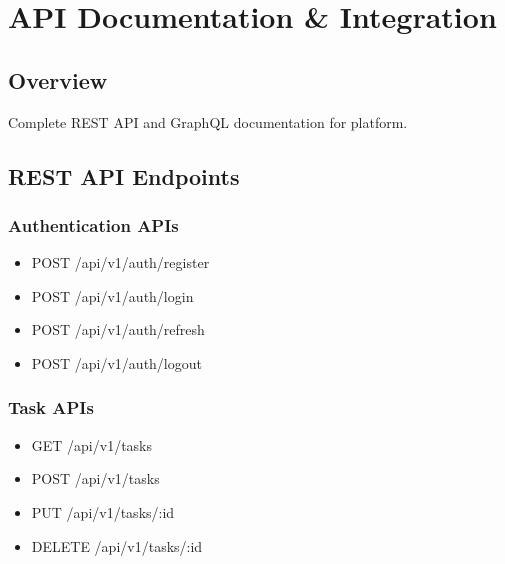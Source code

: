 \chapter{API Documentation \& Integration}
\label{ch:api-documentation}

\section{Overview}

Complete REST API and GraphQL documentation for \lifeos{} platform.

\section{REST API Endpoints}

\subsection{Authentication APIs}
\begin{itemize}
    \item POST /api/v1/auth/register
    \item POST /api/v1/auth/login
    \item POST /api/v1/auth/refresh
    \item POST /api/v1/auth/logout
\end{itemize}

\subsection{Task APIs}
\begin{itemize}
    \item GET /api/v1/tasks
    \item POST /api/v1/tasks
    \item PUT /api/v1/tasks/:id
    \item DELETE /api/v1/tasks/:id
\end{itemize}

